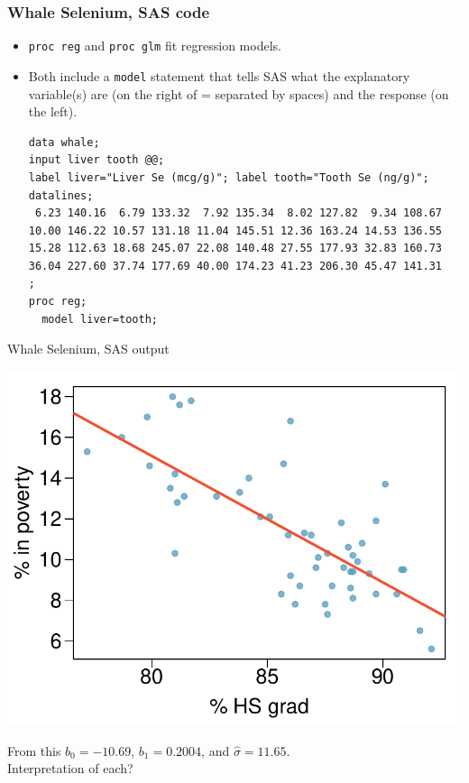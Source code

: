 \documentclass{beamer}
\begin{document}
\begin{frame}[fragile]
\frametitle{Whale Selenium, SAS code}
\begin{itemize}
\item \texttt{proc reg} and \texttt{proc glm} fit regression models.
\item Both include a \texttt{model} statement that tells SAS what the explanatory variable(s) are (on the right of = separated by spaces) and the response (on the left).
\begin{scriptsize}
\begin{verbatim}
data whale;
input liver tooth @@;
label liver="Liver Se (mcg/g)"; label tooth="Tooth Se (ng/g)";
datalines;
 6.23 140.16  6.79 133.32  7.92 135.34  8.02 127.82  9.34 108.67
10.00 146.22 10.57 131.18 11.04 145.51 12.36 163.24 14.53 136.55
15.28 112.63 18.68 245.07 22.08 140.48 27.55 177.93 32.83 160.73
36.04 227.60 37.74 177.69 40.00 174.23 41.23 206.30 45.47 141.31
;
proc reg;
  model liver=tooth;
\end{verbatim}
\end{scriptsize}
\end{itemize}
\end{frame}

\begin{frame}{Whale Selenium, SAS output}
\begin{center}
\includegraphics[scale=0.3]{plots/poverty_hsgrad_line.pdf}
\end{center}
From this $b_0=-10.69$, $b_1=0.2004$, and $\hat{\sigma}=11.65$.\\
Interpretation of each?
\end{frame}
\end{document}
